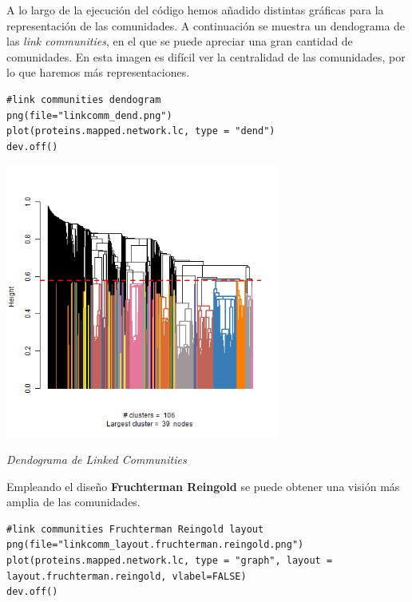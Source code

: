 A lo largo de la ejecución del código hemos añadido distintas gráficas para la representación de las comunidades. A continuación se muestra un dendograma de las \textit{link communities}, en el que se puede apreciar una gran cantidad de comunidades. En esta imagen es difícil ver la centralidad de las comunidades, por lo que haremos más representaciones.

\begin{lstlisting}
#link communities dendogram
png(file="linkcomm_dend.png")
plot(proteins.mapped.network.lc, type = "dend")
dev.off()
\end{lstlisting}

\begin{center}
\includegraphics[width=90mm,scale=1]{report/figures/linkcomm_dend.png}


\caption{\textit{Dendograma de Linked Communities}}

\end{center}


Empleando el diseño \textbf{ Fruchterman Reingold} se puede obtener una visión más amplia de las comunidades. 

\begin{lstlisting}
#link communities Fruchterman Reingold layout
png(file="linkcomm_layout.fruchterman.reingold.png")
plot(proteins.mapped.network.lc, type = "graph", layout =
layout.fruchterman.reingold, vlabel=FALSE)
dev.off()
\end{lstlisting}

